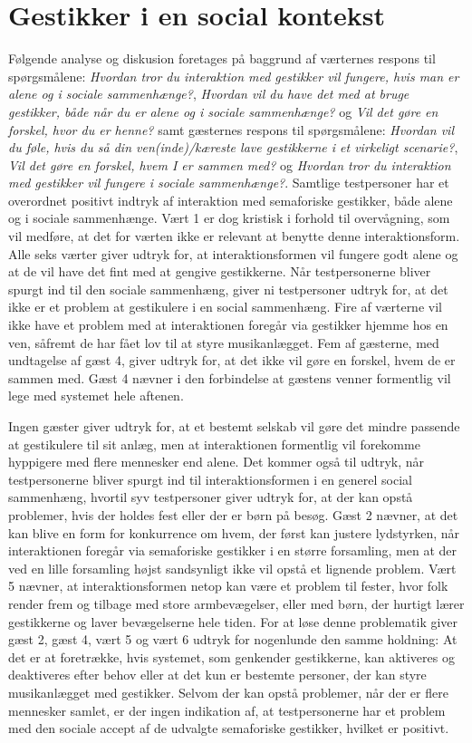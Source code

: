 \section{Gestikker i en social kontekst}
\label{TestresultaterSocialAcceptSocial}
%
Følgende analyse og diskusion foretages på baggrund af værternes respons til spørgsmålene: \textit{Hvordan tror du interaktion med gestikker vil fungere, hvis man er alene og i sociale sammenhænge?}, \textit{Hvordan vil du have det med at bruge gestikker, både når du er alene og i sociale sammenhænge?} og \textit{Vil det gøre en forskel, hvor du er henne?} samt gæsternes respons til spørgsmålene: \textit{Hvordan vil du føle, hvis du så din ven(inde)/kæreste lave gestikkerne i et virkeligt scenarie?}, \textit{Vil det gøre en forskel, hvem I er sammen med?} og \textit{Hvordan tror du interaktion med gestikker vil fungere i sociale sammenhænge?}. \blankline
%
Samtlige testpersoner har et overordnet positivt indtryk af interaktion med semaforiske gestikker, både alene og i sociale sammenhænge. Vært 1 er dog kristisk i forhold til overvågning, som vil medføre, at det for værten ikke er relevant at benytte denne interaktionsform. Alle seks værter giver udtryk for, at interaktionsformen vil fungere godt alene og at de vil have det fint med at gengive gestikkerne. Når testpersonerne bliver spurgt ind til den sociale sammenhæng, giver ni testpersoner udtryk for, at det ikke er et problem at gestikulere i en social sammenhæng. Fire af værterne vil ikke have et problem med at interaktionen foregår via gestikker hjemme hos en ven, såfremt de har fået lov til at styre musikanlægget. Fem af gæsterne, med undtagelse af gæst 4, giver udtryk for, at det ikke vil gøre en forskel, hvem de er sammen med. Gæst 4 nævner i den forbindelse at gæstens venner formentlig vil lege med systemet hele aftenen. 

Ingen gæster giver udtryk for, at et bestemt selskab vil gøre det mindre passende at gestikulere til sit anlæg, men at interaktionen formentlig vil forekomme hyppigere med flere mennesker end alene. Det kommer også til udtryk, når testpersonerne bliver spurgt ind til interaktionsformen i en generel social sammenhæng, hvortil syv testpersoner giver udtryk for, at der kan opstå problemer, hvis der holdes fest eller der er børn på besøg. Gæst 2 nævner, at det kan blive en form for konkurrence om hvem, der først kan justere lydstyrken, når interaktionen foregår via semaforiske gestikker i en større forsamling, men at der ved en lille forsamling højst sandsynligt ikke vil opstå et lignende problem. Vært 5 nævner, at interaktionsformen netop kan være et problem til fester, hvor folk render frem og tilbage med store armbevægelser, eller med børn, der hurtigt lærer gestikkerne og laver bevægelserne hele tiden. For at løse denne problematik giver gæst 2, gæst 4, vært 5 og vært 6 udtryk for nogenlunde den samme holdning: At det er at foretrække, hvis systemet, som genkender gestikkerne, kan aktiveres og deaktiveres efter behov eller at det kun er bestemte personer, der kan styre musikanlægget med gestikker. Selvom der kan opstå problemer, når der er flere mennesker samlet, er der ingen indikation af, at testpersonerne har et problem med den sociale accept af de udvalgte semaforiske gestikker, hvilket er positivt. 

